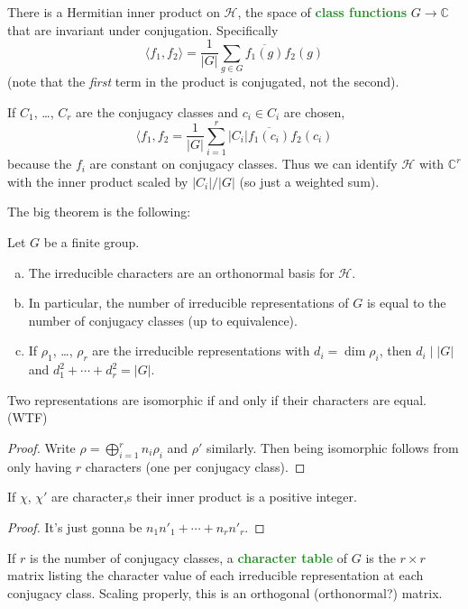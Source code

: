\documentclass[10pt]{scrartcl}
\providecommand{\ol}{\overline}
\providecommand{\CC}{\mathbb C}
\providecommand{\ii}{\item}
\providecommand{\vocab}[1]{{\textbf{\textcolor{ForestGreen}{#1}}}}
\begin{document}
\begin{definition}
	There is a Hermitian inner product on $\mathcal H$, the space of
	\vocab{class functions} $G\to\CC$ that are invariant under conjugation.
	Specifically
	\[\langle f_1,f_2\rangle = \frac{1}{|G|}\sum_{g\in G}\ol{f_1(g)}f_2(g)\]
	(note that the \emph{first} term in the product is conjugated,
	not the second).
\end{definition}

If $C_1$, \dots, $C_r$ are the conjugacy classes and $c_i\in C_i$ are chosen,
\[\langle f_1, f_2 = \frac{1}{|G|}\sum_{i=1}^r |C_i|\ol{f_1(c_i)}f_2(c_i)\]
because the $f_i$ are constant on conjugacy classes.
Thus we can identify $\mathcal H$ with $\CC^r$
with the inner product scaled by $|C_i|/|G|$ (so just a weighted sum).

The big theorem is the following:
\begin{theorem}
	Let $G$ be a finite group.
	\begin{enumerate}[(a)]
		\ii The irreducible characters are an
		orthonormal basis for $\mathcal H$.
		\ii In particular, the number of irreducible representations of $G$
		is equal to the number of conjugacy classes (up to equivalence).
		\ii If $\rho_1$, \dots, $\rho_r$ are the irreducible representations
		with $d_i = \dim\rho_i$, then $d_i\mid |G|$ and
		$d_1^2 + \cdots + d_r^2 = |G|$.
	\end{enumerate}
\end{theorem}

\begin{corollary}
	Two representations are isomorphic if and only if
	their characters are equal. (WTF)
\end{corollary}

\begin{proof}
	Write $\rho = \bigoplus_{i=1}^r n_i\rho_i$ and
	$\rho'$ similarly. Then being isomorphic follows from only having
	$r$ characters (one per conjugacy class).
\end{proof}

\begin{corollary}
	If $\chi$, $\chi'$ are character,s their inner product is
	a positive integer.
\end{corollary}

\begin{proof}
	It's just gonna be $n_1n'_1 + \cdots + n_rn'_r$.
\end{proof}

If $r$ is the number of conjugacy classes, a \vocab{character table}
of $G$ is the $r\times r$ matrix listing the character value
of each irreducible representation at each conjugacy class.
Scaling properly, this is an orthogonal (orthonormal?) matrix.
\end{document}
